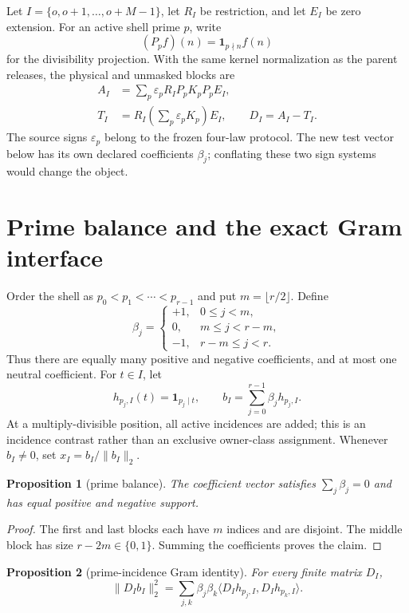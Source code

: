 \documentclass[10pt]{article}
\newtheorem{proposition}{Proposition}
\begin{document}
Let $I=\{o,o+1,\ldots,o+M-1\}$, let $R_I$ be restriction, and let $E_I$ be
zero extension.  For an active shell prime $p$, write
\[
 (P_pf)(n)=\mathbf 1_{p\nmid n}f(n)
\]
for the divisibility projection.  With the same kernel normalization as the
parent releases, the physical and unmasked blocks are
\begin{align*}
 A_I&=\sum_p\varepsilon_pR_IP_pK_pP_pE_I,\\
 T_I&=R_I\left(\sum_p\varepsilon_pK_p\right)E_I,
 \qquad D_I=A_I-T_I.
\end{align*}
The source signs $\varepsilon_p$ belong to the frozen four-law protocol.  The
new test vector below has its own declared coefficients $\beta_j$; conflating
these two sign systems would change the object.

\section{Prime balance and the exact Gram interface}

Order the shell as $p_0<p_1<\cdots<p_{r-1}$ and put $m=\lfloor r/2\rfloor$.
Define
\[
 \beta_j=\begin{cases}
  +1,&0\leq j<m,\\
  0,&m\leq j<r-m,\\
  -1,&r-m\leq j<r.
 \end{cases}
\]
Thus there are equally many positive and negative coefficients, and at most
one neutral coefficient.  For $t\in I$, let
\[
 h_{p_j,I}(t)=\mathbf 1_{p_j\mid t},\qquad
 b_I=\sum_{j=0}^{r-1}\beta_jh_{p_j,I}.
\]
At a multiply-divisible position, all active incidences are added; this is an
incidence contrast rather than an exclusive owner-class assignment.  Whenever
$b_I\ne0$, set $x_I=b_I/\|b_I\|_2$.

\begin{proposition}[prime balance]
The coefficient vector satisfies $\sum_j\beta_j=0$ and has equal positive and
negative support.
\end{proposition}

\begin{proof}
The first and last blocks each have $m$ indices and are disjoint.  The middle
block has size $r-2m\in\{0,1\}$.  Summing the coefficients proves the claim.
\end{proof}

\begin{proposition}[prime-incidence Gram identity]
For every finite matrix $D_I$,
\begin{equation}
 \|D_Ib_I\|_2^2
 =\sum_{j,k}\beta_j\beta_k
   \langle D_Ih_{p_j,I},D_Ih_{p_k,I}\rangle.
 \label{eq:gram}
\end{equation}
\end{proposition}
\end{document}
